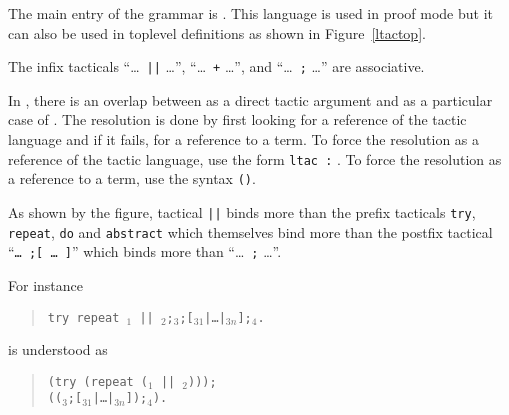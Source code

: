 The main entry of the grammar is {\tacexpr}. This language is used in
proof mode but it can also be used in toplevel definitions as shown in
Figure~\ref{ltactop}.

\begin{Remarks}
\item The infix tacticals ``\dots\ {\tt ||} \dots'', ``\dots\ {\tt +}
  \dots'', and ``\dots\ {\tt ;} \dots'' are associative.

\item In {\tacarg}, there is an overlap between {\qualid} as a
direct tactic argument and {\qualid} as a particular case of
{\term}. The resolution is done by first looking for a reference of
the tactic language and if it fails, for a reference to a term. To
force the resolution as a reference of the tactic language, use the
form {\tt ltac :} {\qualid}. To force the resolution as a reference to
a term, use the syntax {\tt ({\qualid})}.

\item As shown by the figure, tactical {\tt ||} binds more than the
prefix tacticals {\tt try}, {\tt repeat}, {\tt do} and
{\tt abstract} which themselves bind more than the postfix tactical
``{\tt \dots\ ;[ \dots\ ]}'' which binds more than ``\dots\ {\tt ;}
\dots''.

For instance
\begin{quote}
{\tt try repeat \tac$_1$ ||
  \tac$_2$;\tac$_3$;[\tac$_{31}$|\dots|\tac$_{3n}$];\tac$_4$.}
\end{quote}
is understood as 
\begin{quote}
{\tt (try (repeat (\tac$_1$ || \tac$_2$)));} \\
{\tt ((\tac$_3$;[\tac$_{31}$|\dots|\tac$_{3n}$]);\tac$_4$).}
\end{quote}
\end{Remarks}



